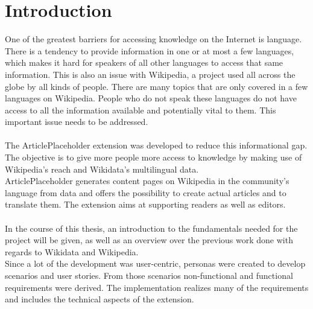 \chapter{Introduction}

One of the greatest barriers for accessing knowledge on the Internet is language. There is a tendency to provide information in one or at most a few languages, which makes it hard for speakers of all other languages to access that same information. This is also an issue with Wikipedia, a project used all across the globe by all kinds of people. There are many topics that are only covered in a few languages on Wikipedia. People who do not speak these languages do not have access to all the information available and potentially vital to them. This important issue needs to be addressed. \\
\\
The ArticlePlaceholder extension was developed to reduce this informational gap. The objective is to give more people more access to knowledge by making use of Wikipedia’s reach and Wikidata’s multilingual data. \\
ArticlePlaceholder generates content pages on Wikipedia in the community's language from data and offers the possibility to create actual articles and to translate them. The extension aims at supporting readers as well as editors. \\
\\
In the course of this thesis, an introduction to the fundamentals needed for the project will be given, as well as an overview over the previous work done with regards to Wikidata and Wikipedia. \\
Since a lot of the development was user-centric, personas were created to develop scenarios and user stories. From those scenarios non-functional and functional requirements were derived. The implementation realizes many of the requirements and includes the technical aspects of the extension.
